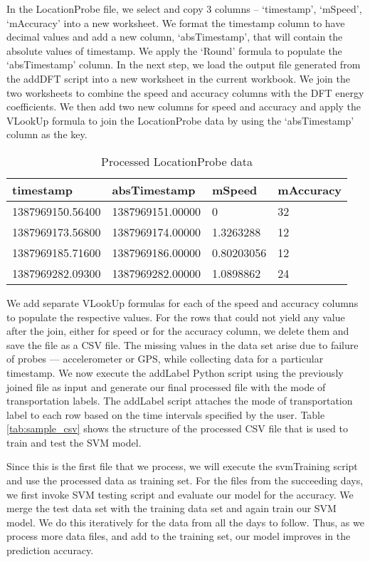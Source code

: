 In the LocationProbe file, we select and copy 3 columns – `timestamp', `mSpeed', `mAccuracy' into a new worksheet. We format the timestamp column to have decimal values and add a new column, `absTimestamp', that will contain the absolute values of timestamp. We apply the `Round' formula to populate the `absTimestamp' column. In the next step, we load the output file generated from the addDFT script into a new worksheet in the current workbook. We join the two worksheets to combine the speed and accuracy columns with the DFT energy coefficients. We then add two new columns for speed and accuracy and apply the VLookUp formula to join the LocationProbe data by using the `absTimestamp' column as the key.

\begin{table}[h]
	\centering	
	\caption{Processed LocationProbe data \label{tab:processed_location_data}}
  	\begin{tabular}{ | p{2cm} | p{2cm} | p{1cm} | p{1.5cm} | }
    	\hline
	    \textbf{timestamp} & \textbf{absTimestamp} & \textbf{mSpeed} & \textbf{mAccuracy} \\ \hline
	    1387969150.56400 & 1387969151.00000 & 0 & 32 \\ \hline
 		1387969173.56800 & 1387969174.00000 & 1.3263288 & 12 \\ \hline
 		1387969185.71600 & 1387969186.00000 & 0.80203056 & 12 \\ \hline
 		1387969282.09300 & 1387969282.00000 & 1.0898862 & 24 \\
	    \hline
  	\end{tabular}
\end{table}

We add separate VLookUp formulas for each of the speed and accuracy columns to populate the respective values. For the rows that could not yield any value after the join, either for speed or for the accuracy column, we delete them and save the file as a CSV file. The missing values in the data set arise due to failure of probes --- accelerometer or GPS, while collecting data for a particular timestamp. We now execute the addLabel Python script using the previously joined file as input and generate our final processed file with the mode of transportation labels. The addLabel script attaches the mode of transportation label to each row based on the time intervals specified by the user. Table \ref{tab:sample_csv} shows the structure of the processed CSV file that is used to train and test the SVM model.

Since this is the first file that we process, we will execute the svmTraining script and use the processed data as training set. For the files from the succeeding days, we first invoke SVM testing script and evaluate our model for the accuracy. We merge the test data set with the training data set and again train our SVM model. We do this iteratively for the data from all the days to follow. Thus, as we process more data files, and add to the training set, our model improves in the prediction accuracy.

